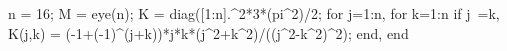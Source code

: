 

 n = 16;
 M = eye(n);
 K = diag([1:n].^2*3*(pi^2)/2;
 for j=1:n, for k=1:n
    if j~=k, K(j,k) = (-1+(-1)^(j+k))*j*k*(j^2+k^2)/((j^2-k^2)^2);
 end, end

  
